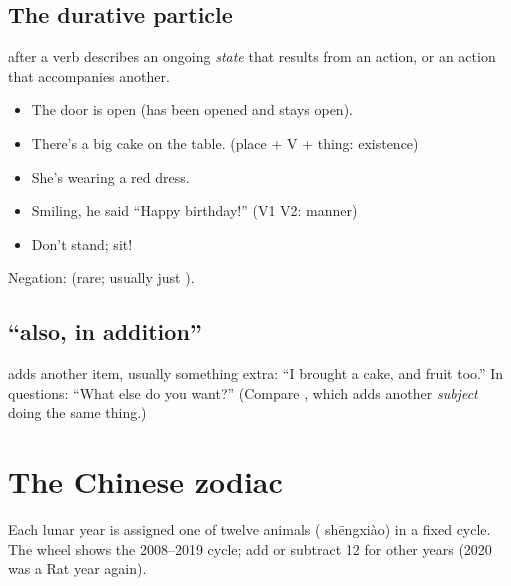 \subsection{The durative particle }

 after a verb describes an ongoing \emph{state} that results from an action, or an
action that accompanies another.
\begin{itemize}
  \item {} The door is open (has been opened and stays open).
  \item {} There's a big cake on the table. (place + V +
        thing: existence)
  \item {} She's wearing a red dress.
  \item {} Smiling, he said ``Happy birthday!'' (V1  V2:
        manner)
  \item {} Don't stand; sit!
\end{itemize}
Negation:  (rare; usually just ).

\subsection{ ``also, in addition''}

 adds another item, usually something extra: 
``I brought a cake, and fruit too.'' In questions:  ``What else do you
want?'' (Compare , which adds another \emph{subject} doing the same thing.)

\section{The Chinese zodiac}

Each lunar year is assigned one of twelve animals ( shēngxiào) in a fixed
cycle. The wheel shows the 2008--2019 cycle; add or subtract 12 for other years (2020 was a Rat year again).

\begin{center}
\end{center}

